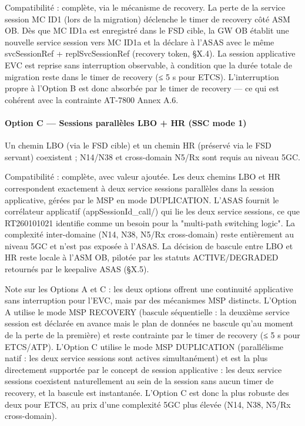 \documentclass[11pt,a4paper]{article}
\begin{document}
Compatibilité : complète, via le mécanisme de recovery. La perte de la service session MC ID1 (lors de la migration) déclenche le timer de recovery côté ASM OB. Dès que MC ID1a est enregistré dans le FSD cible, la GW OB établit une nouvelle service session vers MC ID1a et la déclare à l'ASAS avec le même svcSessionRef + replSvcSessionRef (recovery token, §X.4). La session applicative EVC est reprise sans interruption observable, à condition que la durée totale de migration reste dans le timer de recovery (≤ 5 s pour ETCS). L'interruption propre à l'Option B est donc absorbée par le timer de recovery — ce qui est cohérent avec la contrainte AT-7800 Annex A.6.

\paragraph{Option C — Sessions parallèles LBO + HR (SSC mode 1)}
Un chemin LBO (via le FSD cible) et un chemin HR (préservé via le FSD servant) coexistent ; N14/N38 et cross-domain N5/Rx sont requis au niveau 5GC.

Compatibilité : complète, avec valeur ajoutée. Les deux chemins LBO et HR correspondent exactement à deux service sessions parallèles dans la session applicative, gérées par le MSP en mode DUPLICATION. L'ASAS fournit le corrélateur applicatif ({appSessionId\_call}\-/) qui lie les deux service sessions, ce que RT260101021 identifie comme un besoin pour la "multi-path switching logic". La complexité inter-domaine (N14, N38, N5/Rx cross-domain) reste entièrement au niveau 5GC et n'est pas exposée à l'ASAS. La décision de bascule entre LBO et HR reste locale à l'ASM OB, pilotée par les statuts ACTIVE/DEGRADED retournés par le keepalive ASAS (§X.5).

Note sur les Options A et C : les deux options offrent une continuité applicative sans interruption pour l'EVC, mais par des mécanismes MSP distincts. L'Option A utilise le mode MSP RECOVERY (bascule séquentielle : la deuxième service session est déclarée en avance mais le plan de données ne bascule qu'au moment de la perte de la première) et reste contrainte par le timer de recovery (≤ 5 s pour ETCS/ATP). L'Option C utilise le mode MSP DUPLICATION (parallélisme natif : les deux service sessions sont actives simultanément) et est la plus directement supportée par le concept de session applicative : les deux service sessions coexistent naturellement au sein de la session sans aucun timer de recovery, et la bascule est instantanée. L'Option C est donc la plus robuste des deux pour ETCS, au prix d'une complexité 5GC plus élevée (N14, N38, N5/Rx cross-domain).
\end{document}
